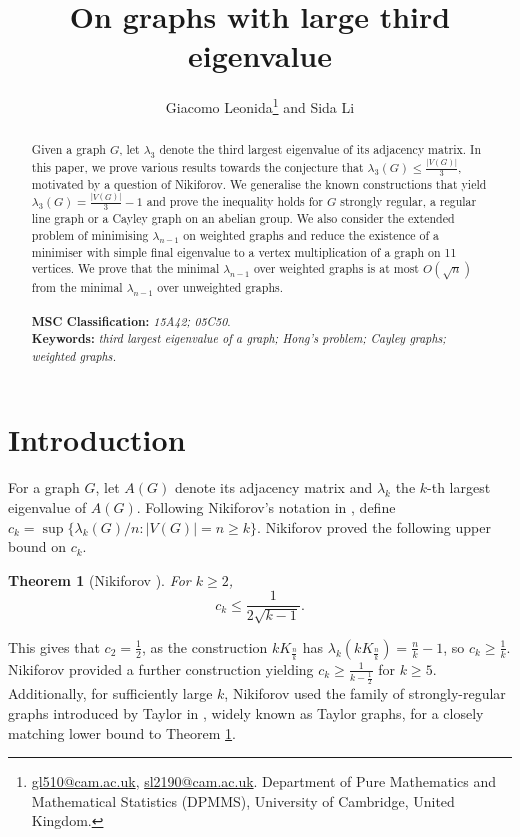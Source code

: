 \documentclass[12pt]{article}
\title{On graphs with large third eigenvalue}
\author{Giacomo Leonida\thanks{\href{mailto:gl510@cam.ac.uk}{gl510@cam.ac.uk}, \href{mailto:sl2190@cam.ac.uk}{sl2190@cam.ac.uk}. Department of Pure Mathematics and Mathematical Statistics
(DPMMS), University of Cambridge, United Kingdom.}\; and Sida Li\footnotemark[1]}
\date{}
\newtheorem{thm}{Theorem}[section]
\begin{document}
\maketitle
\begin{abstract}
    Given a graph $G$, let $\lambda_3$ denote the third largest eigenvalue of its adjacency matrix. In this paper, we prove various results towards the conjecture that $\lambda_3(G) \le \frac{|V(G)|}{3}$, motivated by a question of Nikiforov. We generalise the known constructions that yield $\lambda_3(G) = \frac{|V(G)|}{3} - 1$ and prove the inequality holds for $G$ strongly regular, a regular line graph or a Cayley graph on an abelian group. We also consider the extended problem of minimising $\lambda_{n-1}$ on weighted graphs and reduce the existence of a minimiser with simple final eigenvalue to a vertex multiplication of a graph on 11 vertices. We prove that the minimal $\lambda_{n-1}$ over weighted graphs is at most $O(\sqrt{n})$ from the minimal $\lambda_{n-1}$ over unweighted graphs. \\ \\
    \textbf{MSC Classification:} \textit{15A42; 05C50}.\\ 
    \textbf{Keywords:} \textit{third largest eigenvalue of a graph; Hong's problem; Cayley graphs; weighted graphs.}
\end{abstract}

\section{Introduction}

For a graph $G$, let $A(G)$ denote its adjacency matrix and $\lambda_k$ the $k$-th largest eigenvalue of $A(G)$. Following Nikiforov's notation in \cite{NikiforovEvals}, define $c_k = \sup\{\lambda_k(G)/n : |V(G)| = n \ge k\}$. Nikiforov proved the following upper bound on $c_k$.

\begin{thm}[Nikiforov \cite{NikiforovEvals}]\label{thm:nikiforov-upper}
    For $k \ge 2$,
    \[c_k \le \frac{1}{2\sqrt{k-1}}.\]
\end{thm}

This gives that $c_2 = \frac{1}{2}$, as the construction $kK_{\frac{n}{k}}$ has $\lambda_k(kK_{\frac{n}{k}}) = \frac{n}{k} - 1$, so $c_k \ge \frac1k$. Nikiforov provided a further construction yielding $c_k \ge \frac{1}{k - \frac12}$ for $k \ge 5$. Additionally, for sufficiently large $k$, Nikiforov used the family of strongly-regular graphs introduced by Taylor in \cite{TaylorGraphs1, TaylorGraphs2}, widely known as Taylor graphs, for a closely matching lower bound to Theorem \ref{thm:nikiforov-upper}.
\end{document}
